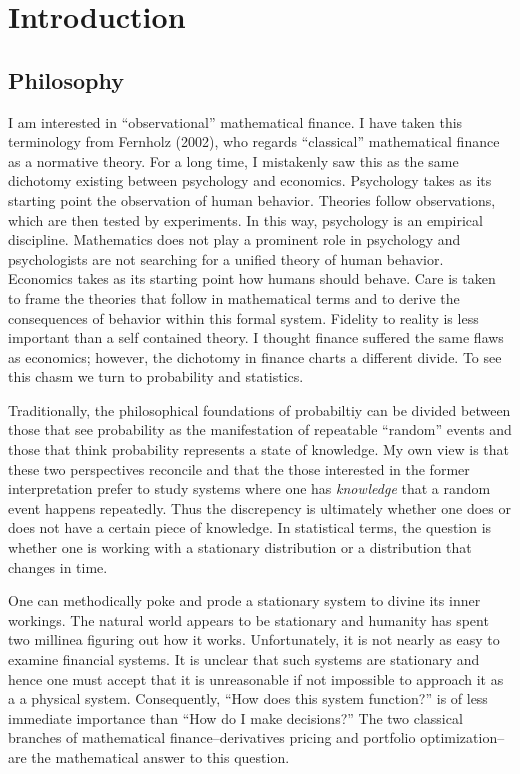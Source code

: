 \documentclass{report}
\begin{document}
\large %
\linespread{1.1} %

\setcounter{section}{0}

\tableofcontents

\chapter{Introduction}

\section{Philosophy}

I am interested in ``observational'' mathematical finance.  I have
taken this terminology from Fernholz (2002), who regards ``classical''
mathematical finance as a normative theory.  For a long time, I
mistakenly saw this as the same dichotomy existing between psychology
and economics.  Psychology takes as its starting point the observation
of human behavior.  Theories follow observations, which are then
tested by experiments.  In this way, psychology is an empirical
discipline.  Mathematics does not play a prominent role in psychology
and psychologists are not searching for a unified theory of human
behavior.  Economics takes as its starting point how humans should
behave.  Care is taken to frame the theories that follow in
mathematical terms and to derive the consequences of behavior within
this formal system.  Fidelity to reality is less important than a self
contained theory.  I thought finance suffered the same flaws as
economics; however, the dichotomy in finance charts a different
divide.  To see this chasm we turn to probability and statistics.

Traditionally, the philosophical foundations of probabiltiy can be
divided between those that see probability as the manifestation of
repeatable ``random'' events and those that think probability
represents a state of knowledge.  My own view is that these two
perspectives reconcile and that the those interested in the former
interpretation prefer to study systems where one has \emph{knowledge}
that a random event happens repeatedly.  Thus the discrepency is
ultimately whether one does or does not have a certain piece of
knowledge.  In statistical terms, the question is whether one is
working with a stationary distribution or a distribution that changes
in time.  

One can methodically poke and prode a stationary system to divine its
inner workings.  The natural world appears to be stationary and
humanity has spent two millinea figuring out how it works. 
Unfortunately, it is not nearly as easy to examine financial systems.
It is unclear that such systems are stationary and hence one must
accept that it is unreasonable if not impossible to approach it as a a
physical system.  Consequently, ``How does this system function?'' is
of less immediate importance than ``How do I make decisions?''  The
two classical branches of mathematical finance--derivatives pricing
and portfolio optimization--are the mathematical answer to this
question.
\end{document}
